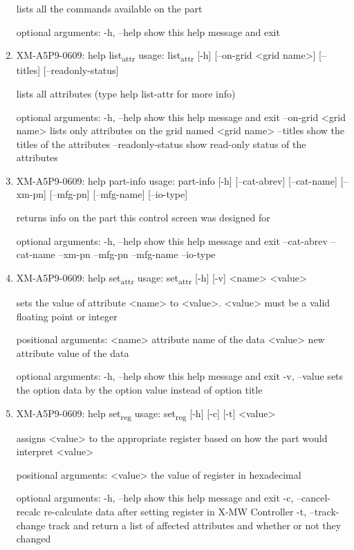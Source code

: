 \documentclass[11pt]{article}
\begin{document}
\begin{enumerate}
lists all the commands available on the part

optional arguments:
  -h, --help  show this help message and exit

\item XM-A5P9-0609: help list\textsubscript{attr}
\label{sec:orgb031d17}
usage: list\textsubscript{attr} [-h] [--on-grid <grid name>] [--titles] [--readonly-status]

lists all attributes (type help list-attr for more info)

optional arguments:
  -h, --help            show this help message and exit
  --on-grid <grid name>
                        lists only attributes on the grid named <grid name>
  --titles              show the titles of the attributes
  --readonly-status     show read-only status of the attributes

\item XM-A5P9-0609: help part-info
\label{sec:org90ba504}
usage: part-info  [-h] [--cat-abrev] [--cat-name] [--xm-pn] [--mfg-pn] [--mfg-name]
        [--io-type]

returns info on the part this control screen was designed for

optional arguments:
  -h, --help   show this help message and exit
  --cat-abrev
  --cat-name
  --xm-pn
  --mfg-pn
  --mfg-name
  --io-type

\item XM-A5P9-0609: help set\textsubscript{attr}
\label{sec:orgf93c9e6}
usage: set\textsubscript{attr} [-h] [-v] <name> <value>

sets the value of attribute <name> to <value>. <value> must be a valid
floating point or integer

positional arguments:
  <name>       attribute name of the data
  <value>      new attribute value of the data

optional arguments:
  -h, --help   show this help message and exit
  -v, --value  sets the option data by the option value instead of option
               title

\item XM-A5P9-0609: help set\textsubscript{reg}
\label{sec:orgd37b157}
usage: set\textsubscript{reg} [-h] [-c] [-t] <value>

assigns <value> to the appropriate register based on how the part would
interpret <value>

positional arguments:
  <value>              the value of register in hexadecimal

optional arguments:
  -h, --help           show this help message and exit
  -c, --cancel-recalc  re-calculate data after setting register in X-MW
                       Controller
  -t, --track-change   track and return a list of affected attributes and
                       whether or not they changed


\end{enumerate}
\end{document}
